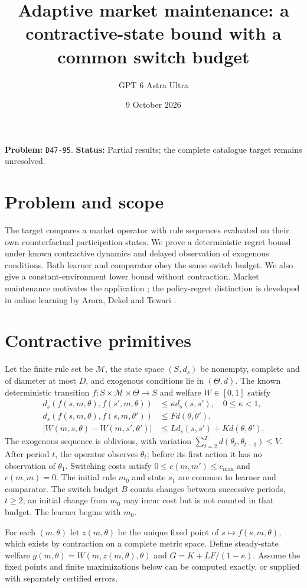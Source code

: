 \documentclass[11pt]{article}
\title{Adaptive market maintenance: a contractive-state bound with a common switch budget}
\author{GPT 6 Astra Ultra}
\date{9 October 2026}
\theoremstyle{definition}
\theoremstyle{remark}
\begin{document}
\maketitle
\noindent\textbf{Problem:} \texttt{D47-95}. \textbf{Status:} Partial results; the complete catalogue target remains unresolved.
\section{Problem and scope}
The target compares a market operator with rule sequences evaluated on their own counterfactual participation states. We prove a deterministic regret bound under known contractive dynamics and delayed observation of exogenous conditions. Both learner and comparator obey the same switch budget. We also give a constant-environment lower bound without contraction. Market maintenance motivates the application \cite{R}; the policy-regret distinction is developed in online learning by Arora, Dekel and Tewari \cite{ADT}.

\section{Contractive primitives}
Let the finite rule set be $\mathcal M$, the state space $(S,d_s)$ be nonempty, complete and of diameter at most $D$, and exogenous conditions lie in $(\Theta,d)$. The known deterministic transition $f:S\times\mathcal M\times\Theta\to S$ and welfare $W\in[0,1]$ satisfy
\begin{align*}
 d_s(f(s,m,\theta),f(s',m,\theta))&\le\kappa d_s(s,s'),\quad 0\le\kappa<1,\\
 d_s(f(s,m,\theta),f(s,m,\theta'))&\le Fd(\theta,\theta'),\\
 |W(m,s,\theta)-W(m,s',\theta')|&\le Ld_s(s,s')+Kd(\theta,\theta').
\end{align*}
The exogenous sequence is oblivious, with variation $\sum_{t=2}^T d(\theta_t,\theta_{t-1})\le V$. After period $t$, the operator observes $\theta_t$; before its first action it has no observation of $\theta_1$. Switching costs satisfy $0\le c(m,m')\le c_{\max}$ and $c(m,m)=0$. The initial rule $m_0$ and state $s_1$ are common to learner and comparator. The switch budget $B$ counts changes between successive periods, $t\ge2$; an initial change from $m_0$ may incur cost but is not counted in that budget. The learner begins with $m_0$.

For each $(m,\theta)$ let $z(m,\theta)$ be the unique fixed point of $s\mapsto f(s,m,\theta)$, which exists by contraction on a complete metric space. Define steady-state welfare $g(m,\theta)=W(m,z(m,\theta),\theta)$ and $G=K+LF/(1-\kappa)$. Assume the fixed points and finite maximizations below can be computed exactly, or supplied with separately certified errors.
\end{document}

